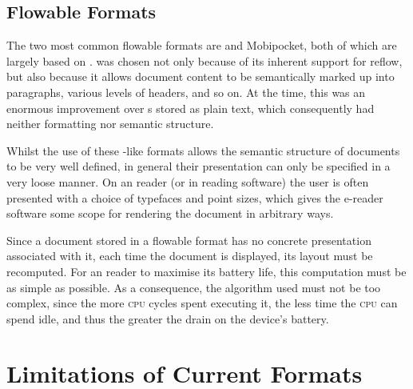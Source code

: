 

\subsection{Flowable Formats}
\label{sec:flowableformats}

The two most common flowable \ebook{} formats are \epub{} and Mobipocket, both of which are largely based on \html{}. \html{} was chosen not only because of its inherent support for reflow, but also because it allows document content to be semantically marked up into paragraphs, various levels of headers, and so on. At the time, this was an enormous improvement over \ebook{}s stored as plain text, which consequently had neither formatting nor semantic structure. 

Whilst the use of these \html{}-like formats allows the semantic structure of documents to be very well defined, in general their presentation can only be specified in a very loose manner. On an \ebook{} reader (or in \ebook{} reading software) the user is often presented with a choice of typefaces and point sizes, which gives the e-reader software some scope for rendering the document in arbitrary ways.

Since a document stored in a flowable format has no concrete presentation associated with it, each time the document is displayed, its layout must be recomputed. For an \ebook{} reader to maximise its battery life, this computation must be as simple as possible. As a consequence, the algorithm used must not be too complex, since the more \textsc{cpu} cycles spent executing it, the less time the \textsc{cpu} can spend idle, and thus the greater the drain on the device's battery.


\section{Limitations of Current Formats}

